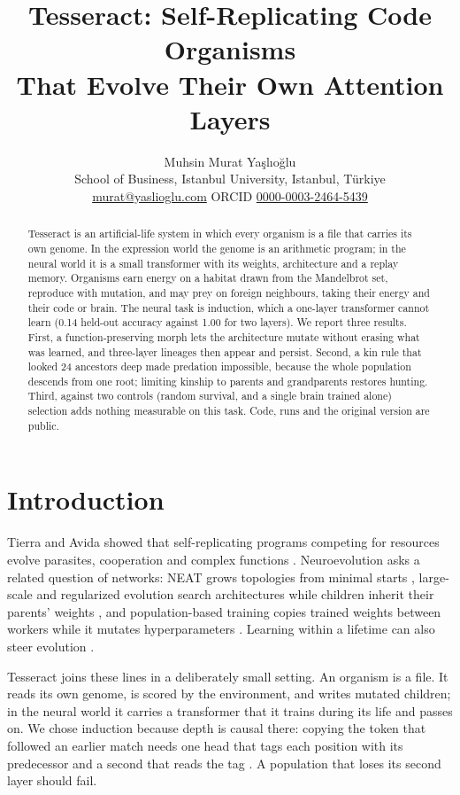 \documentclass[10pt,twocolumn]{article}
\title{\vspace{-1.2em}\Large\bfseries Tesseract: Self-Replicating Code Organisms\\That Evolve Their Own Attention Layers\vspace{-0.4em}}
\author{Muhsin Murat Ya\c{s}l{\i}o\u{g}lu\\
\small School of Business, Istanbul University, Istanbul, T\"urkiye\\
\small \href{mailto:murat@yaslioglu.com}{murat@yaslioglu.com} \quad ORCID \href{https://orcid.org/0000-0003-2464-5439}{0000-0003-2464-5439}}
\date{\vspace{-1.6em}}
\begin{document}
\maketitle

\begin{abstract}
\noindent Tesseract is an artificial-life system in which every organism is a
file that carries its own genome. In the expression world the genome is an
arithmetic program; in the neural world it is a small transformer with its
weights, architecture and a replay memory. Organisms earn energy on a habitat
drawn from the Mandelbrot set, reproduce with mutation, and may prey on foreign
neighbours, taking their energy and their code or brain. The neural task is
induction, which a one-layer transformer cannot learn (0.14 held-out accuracy
against 1.00 for two layers). We report three results. First, a
function-preserving morph lets the architecture mutate without erasing what
was learned, and three-layer lineages then appear and persist. Second, a kin
rule that looked 24 ancestors deep made predation impossible, because the
whole population descends from one root; limiting kinship to parents and
grandparents restores hunting. Third, against two controls (random survival,
and a single brain trained alone) selection adds nothing measurable on this
task. Code, runs and the original version are public.
\end{abstract}

\section{Introduction}
Tierra and Avida showed that self-replicating programs competing for resources
evolve parasites, cooperation and complex functions \cite{ray,avida,lenski}.
Neuroevolution asks a related question of networks: NEAT grows topologies from
minimal starts \cite{neat}, large-scale and regularized evolution search
architectures while children inherit their parents' weights
\cite{real17,real19}, and population-based training copies trained weights
between workers while it mutates hyperparameters \cite{pbt}. Learning within a
lifetime can also steer evolution \cite{hinton}.

Tesseract joins these lines in a deliberately small setting. An organism is a
file. It reads its own genome, is scored by the environment, and writes mutated
children; in the neural world it carries a transformer \cite{vaswani} that it
trains during its life and passes on. We chose induction because depth is
causal there: copying the token that followed an earlier match needs one head
that tags each position with its predecessor and a second that reads the tag
\cite{elhage,olsson}. A population that loses its second layer should fail.
\end{document}
